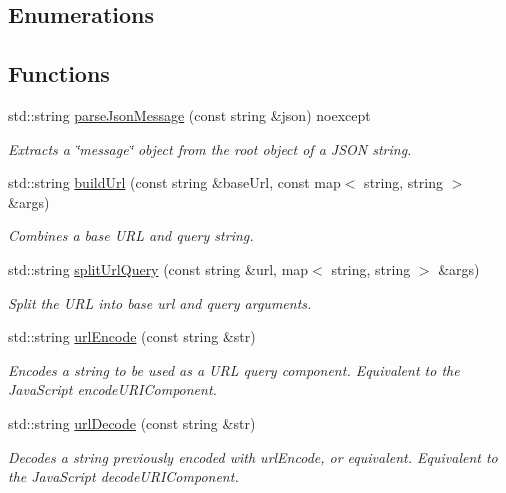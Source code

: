 \subsection*{Enumerations}
\subsection*{Functions}
\begin{DoxyCompactItemize}
\item 
std\+::string \hyperlink{group___utility_module_gab8f3ab23c87fe876bb3e9b76fc46fff9}{parse\+Json\+Message} (const string \&json) noexcept
\begin{DoxyCompactList}\small\item\em Extracts a \char`\"{}message\char`\"{} object from the root object of a J\+S\+ON string. \end{DoxyCompactList}\item 
std\+::string \hyperlink{group___network_module_ga0da8fb7d0201ab9eb336b86047a4cbf6}{build\+Url} (const string \&base\+Url, const map$<$ string, string $>$ \&args)
\begin{DoxyCompactList}\small\item\em Combines a base U\+RL and query string. \end{DoxyCompactList}\item 
std\+::string \hyperlink{group___network_module_ga39931550a7bb4a32d7fd6ef6bc3e4a14}{split\+Url\+Query} (const string \&url, map$<$ string, string $>$ \&args)
\begin{DoxyCompactList}\small\item\em Split the U\+RL into base url and query arguments. \end{DoxyCompactList}\item 
std\+::string \hyperlink{group___network_module_gaaa9055eea94c920782da31b4136243e7}{url\+Encode} (const string \&str)
\begin{DoxyCompactList}\small\item\em Encodes a string to be used as a U\+RL query component. Equivalent to the Java\+Script encode\+U\+R\+I\+Component. \end{DoxyCompactList}\item 
std\+::string \hyperlink{group___network_module_gae91a77df82de63d6bce7940e22d5db0e}{url\+Decode} (const string \&str)
\begin{DoxyCompactList}\small\item\em Decodes a string previously encoded with url\+Encode, or equivalent. Equivalent to the Java\+Script decode\+U\+R\+I\+Component. \end{DoxyCompactList}\item 

\end{DoxyCompactItemize}

